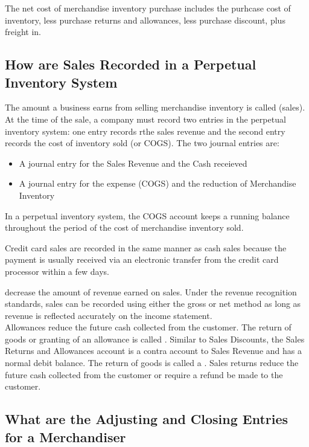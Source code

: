 \documentclass{article}
\begin{document}
The net cost of merchandise inventory purchase includes the purhcase cost of inventory, less purchase returns and allowances, less purchase discount, plus freight in. 

\subsection{How are Sales Recorded in a Perpetual Inventory System}

The amount a business earns from selling merchandise inventory is called  (sales). At the time of the sale, a company must record two entries in the perpetual inventory system: one entry records rthe sales revenue and the second entry records the cost of inventory sold (or COGS). The two journal entries are: 
\begin{itemize}
  \item A journal entry for the Sales Revenue and the Cash receieved 
  \item A journal entry for the expense (COGS) and the reduction of Merchandise Inventory
\end{itemize}

In a perpetual inventory system, the COGS account keeps a running balance throughout the period of the cost of merchandise inventory sold. 

\begin{remark}
  Credit card sales are recorded in the same manner as cash sales because the payment is usually received via an electronic transfer from the credit card processor within a few days. 
\end{remark}

 decrease the amount of revenue earned on sales. Under the revenue recognition standards, sales can be recorded using either the gross or net method as long as revenue is reflected accurately on the income statement. \\ 

Allowances reduce the future cash collected from the customer. The return of goods or granting of an allowance is called . Similar to Sales Discounts, the Sales Returns and Allowances account is a contra account to Sales Revenue and has a normal debit balance. The return of goods is called a . Sales returns reduce the future cash collected from the customer or require a refund be made to the customer. 

\subsection{What are the Adjusting and Closing Entries for a Merchandiser}
\end{document}
